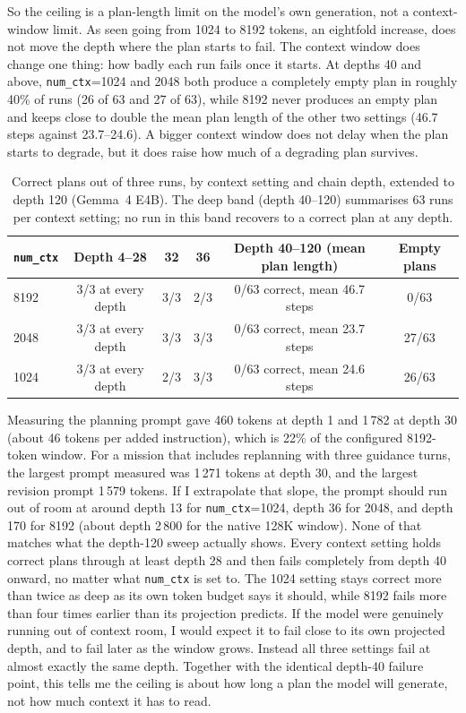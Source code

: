So the ceiling is a plan-length limit on
the model's own generation, not a context-window limit. As seen going from 1024 to 8192
tokens, an eightfold increase, does not move the depth where the plan starts to
fail. The context window does change one thing: how badly each run fails once it
starts. At depths 40 and above, \texttt{num\_ctx}=1024 and 2048 both produce a
completely empty plan in roughly 40\% of runs (26 of 63 and 27 of 63), while 8192
never produces an empty plan and keeps close to double the mean plan length of
the other two settings (46.7 steps against 23.7--24.6). A bigger context window
does not delay when the plan starts to degrade, but it does raise how much of a
degrading plan survives.


\begin{table}[htbp]
    \centering
    \caption{Correct plans out of three runs, by context setting and chain depth,
    extended to depth 120 (Gemma~4 E4B). The deep band (depth 40--120) summarises
    63 runs per context setting; no run in this band recovers to a correct plan at
    any depth.}
    \label{tab:ctx}
    \begin{tabular}{lccccc}
        \toprule
        \texttt{num\_ctx} & Depth 4--28 & 32 & 36 & Depth 40--120 (mean plan length) & Empty plans \\
        \midrule
        8192 & 3/3 at every depth & 3/3 & 2/3 & 0/63 correct, mean 46.7 steps & 0/63 \\
        2048 & 3/3 at every depth & 3/3 & 3/3 & 0/63 correct, mean 23.7 steps & 27/63 \\
        1024 & 3/3 at every depth & 2/3 & 3/3 & 0/63 correct, mean 24.6 steps & 26/63 \\
        \bottomrule
    \end{tabular}
\end{table}

Measuring the planning prompt gave 460 tokens at depth 1 and 1\,782 at depth 30
(about 46 tokens per added instruction), which is 22\% of the configured
8192-token window. For a mission that includes replanning with three guidance
turns, the largest prompt measured was 1\,271 tokens at depth 30, and the
largest revision prompt 1\,579 tokens. If I extrapolate that slope, the prompt
should run out of room at around depth 13 for \texttt{num\_ctx}=1024, depth 36
for 2048, and depth 170 for 8192 (about depth 2\,800 for the native 128K
window). None of that matches what the depth-120 sweep actually shows. Every
context setting holds correct plans through at least depth 28 and then fails
completely from depth 40 onward, no matter what \texttt{num\_ctx} is set to.
The 1024 setting stays correct more than twice as deep as its own token budget
says it should, while 8192 fails more than four times earlier than its
projection predicts. If the model were genuinely running out of context room,
I would expect it to fail close to its own projected depth, and to fail later
as the window grows. Instead all three settings fail at almost exactly the
same depth. Together with the identical depth-40 failure point, this tells me
the ceiling is about how long a plan the model will generate, not how much
context it has to read.


